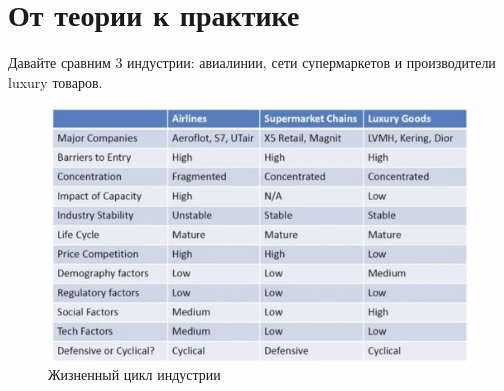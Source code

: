 \documentclass{article}
\begin{document}
	\section{От теории к практике}
	Давайте сравним 3 индустрии: авиалинии, сети супермаркетов и производители luxury товаров.
	\begin{figure}[h]
		\centering
		\includegraphics[scale = 0.27]{practice.jpg}
		\caption{Жизненный цикл индустрии}
		\label{model}
	\end{figure}
\end{document}
